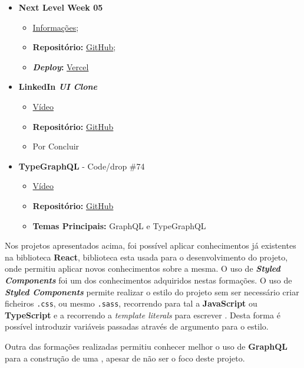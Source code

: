 \begin{minipage}[t]{0.45\textwidth}
	\begin{itemize}
		\item \textbf{Next Level Week 05}
			\begin{itemize}
				\item \href{http://nextlevelweek.com/}{Informações};
				\item \textbf{Repositório:} \href{https://github.com/TutoDS/nlw05-react}{GitHub};
				\item \textbf{\textit{Deploy}:} \href{https://podcastr-tutods.vercel.app/}{Vercel}
			\end{itemize}

		\item \textbf{LinkedIn \textit{UI Clone}}
			\begin{itemize}
				\item \href{https://www.youtube.com/watch?v=xP3cxbDUtrc}{Vídeo}
				\item \textbf{Repositório:} \href{https://github.com/TutoDS/reactjs-linkedin-clone}{GitHub}
				\item Por Concluir
			\end{itemize}

		\item \textbf{TypeGraphQL} - Code/drop \#74
			\begin{itemize}
				\item \href{https://www.youtube.com/watch?v=qMc5A5-Ktuw}{Vídeo}
				\item \textbf{Repositório:} \href{https://github.com/TutoDS/typegraphql-code-drops-74}{GitHub}
				\item \textbf{Temas Principais:} GraphQL e TypeGraphQL
			\end{itemize}
	\end{itemize}
\end{minipage}

\vspace{10pt}

Nos projetos apresentados acima, foi possível aplicar conhecimentos já existentes na biblioteca \textbf{React}, biblioteca esta usada para o desenvolvimento do projeto, onde permitiu aplicar novos conhecimentos sobre a mesma. O uso de \textit{\textbf{Styled Components}} foi um dos conhecimentos adquiridos nestas formações. O uso de \textit{\textbf{Styled Components}} permite realizar o estilo do projeto sem ser necessário criar ficheiros \texttt{.css}, ou mesmo \texttt{.sass}, recorrendo para tal a \textbf{JavaScript} ou \textbf{TypeScript} e a recorrendo a \textit{template literals} para escrever \textbf{}. Desta forma é possível introduzir variáveis passadas através de argumento para o estilo.

Outra das formações realizadas permitiu conhecer melhor o uso de \textbf{GraphQL} para a construção de uma \textbf{}, apesar de não ser o foco deste projeto.
